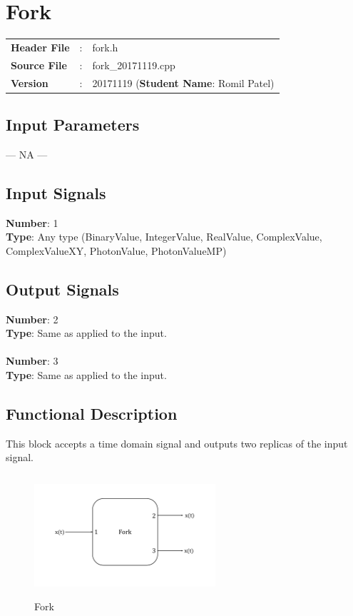 \clearpage

\section{Fork}

\begin{tcolorbox}	
\begin{tabular}{p{2.75cm} p{0.2cm} p{10.5cm}} 	
\textbf{Header File}   &:& fork.h \\
\textbf{Source File}   &:& fork\_20171119.cpp \\
\textbf{Version}       &:& 20171119 (\textbf{Student Name}: Romil Patel)
\end{tabular}
\end{tcolorbox}

\subsection*{Input Parameters}

--- NA ---

\subsection*{Input Signals}

\textbf{Number}: 1\\
\textbf{Type}: Any type (BinaryValue, IntegerValue, RealValue, ComplexValue, ComplexValueXY, PhotonValue, PhotonValueMP)

\subsection*{Output Signals}

\textbf{Number}: 2\\
\textbf{Type}: Same as applied to the input.\\
\\
\textbf{Number}: 3\\
\textbf{Type}: Same as applied to the input.

\subsection*{Functional Description}

This block accepts a time domain signal and outputs two replicas of the input signal.

\begin{figure}[h]
	\centering
	\includegraphics[width=0.6\textwidth, height=4.5cm]{./lib/fork/figures/fork.pdf}
	\caption{Fork}\label{}
\end{figure}